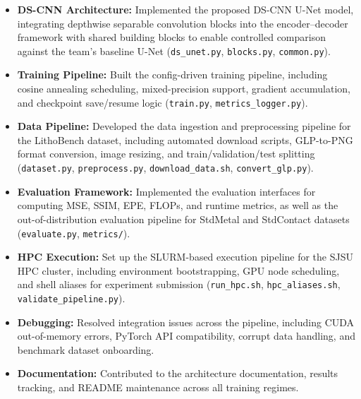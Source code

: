 \documentclass[conference]{IEEEtran}
\begin{document}
\begin{itemize}
    \item \textbf{DS-CNN Architecture:} Implemented the proposed DS-CNN U-Net model, integrating depthwise separable convolution blocks into the encoder--decoder framework with shared building blocks to enable controlled comparison against the team's baseline U-Net (\texttt{ds\_unet.py}, \texttt{blocks.py}, \texttt{common.py}).

    \item \textbf{Training Pipeline:} Built the config-driven training pipeline, including cosine annealing scheduling, mixed-precision support, gradient accumulation, and checkpoint save/resume logic (\texttt{train.py}, \texttt{metrics\_logger.py}).

    \item \textbf{Data Pipeline:} Developed the data ingestion and preprocessing pipeline for the LithoBench dataset, including automated download scripts, GLP-to-PNG format conversion, image resizing, and train/validation/test splitting (\texttt{dataset.py}, \texttt{preprocess.py}, \texttt{download\_data.sh}, \texttt{convert\_glp.py}).

    \item \textbf{Evaluation Framework:} Implemented the evaluation interfaces for computing MSE, SSIM, EPE, FLOPs, and runtime metrics, as well as the out-of-distribution evaluation pipeline for StdMetal and StdContact datasets (\texttt{evaluate.py}, \texttt{metrics/}).

    \item \textbf{HPC Execution:} Set up the SLURM-based execution pipeline for the SJSU HPC cluster, including environment bootstrapping, GPU node scheduling, and shell aliases for experiment submission (\texttt{run\_hpc.sh}, \texttt{hpc\_aliases.sh}, \texttt{validate\_pipeline.py}).

    \item \textbf{Debugging:} Resolved integration issues across the pipeline, including CUDA out-of-memory errors, PyTorch API compatibility, corrupt data handling, and benchmark dataset onboarding.

    \item \textbf{Documentation:} Contributed to the architecture documentation, results tracking, and README maintenance across all training regimes.
\end{itemize}
\end{document}
